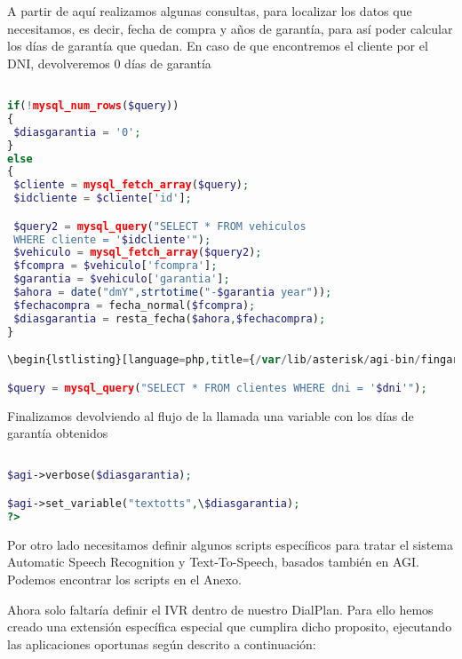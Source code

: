 A partir de aquí realizamos algunas consultas, para localizar los datos que necesitamos, es decir, fecha de compra y años de garantía, para así poder calcular los días de garantía que quedan. En caso de que encontremos el cliente por el DNI, devolveremos 0 días de garantía

\begin{lstlisting}[language=php,title={/var/lib/asterisk/agi-bin/fingarantia.php}]

if(!mysql_num_rows($query))
{
 $diasgarantia = '0';
}
else
{
 $cliente = mysql_fetch_array($query);
 $idcliente = $cliente['id'];

 $query2 = mysql_query("SELECT * FROM vehiculos 
 WHERE cliente = '$idcliente'");
 $vehiculo = mysql_fetch_array($query2);
 $fcompra = $vehiculo['fcompra'];
 $garantia = $vehiculo['garantia'];
 $ahora = date("dmY",strtotime("-$garantia year"));
 $fechacompra = fecha_normal($fcompra);
 $diasgarantia = resta_fecha($ahora,$fechacompra);
}

\begin{lstlisting}[language=php,title={/var/lib/asterisk/agi-bin/fingarantia.php}]

$query = mysql_query("SELECT * FROM clientes WHERE dni = '$dni'");

\end{lstlisting}

Finalizamos devolviendo al flujo de la llamada una variable con los días de garantía obtenidos

\begin{lstlisting}[language=php,title={/var/lib/asterisk/agi-bin/fingarantia.php}]

$agi->verbose($diasgarantia);

$agi->set_variable("textotts",\$diasgarantia);
?>

\end{lstlisting}

Por otro lado necesitamos definir algunos scripts específicos para tratar el sistema Automatic Speech Recognition y Text-To-Speech, basados también en AGI. Podemos encontrar los scripts en el Anexo.

Ahora solo faltaría definir el IVR dentro de nuestro DialPlan. Para ello hemos creado una extensión específica especial que cumplira dicho proposito, ejecutando las aplicaciones oportunas según descrito a continuación:

